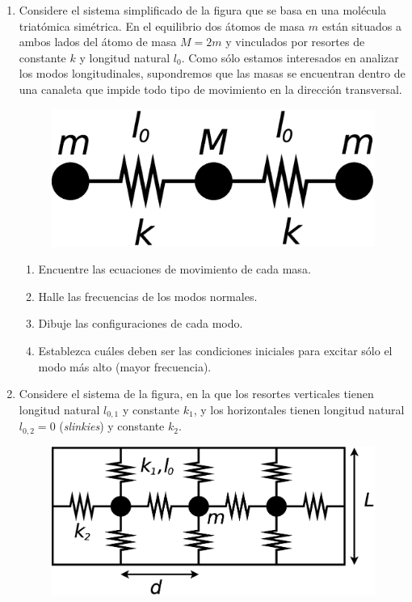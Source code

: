 \documentclass[11pt,spanish]{article}
\begin{document}
\begin{enumerate}

    \item Considere el sistema simplificado de la figura que se basa en una
    molécula triatómica simétrica. En el equilibrio dos átomos de masa $m$
    están situados a ambos lados del átomo de masa $M=2m$ y vinculados por
    resortes de constante $k$ y longitud natural $l_{0}$. Como sólo estamos
    interesados en analizar los modos longitudinales, supondremos que las masas
    se encuentran dentro de una canaleta que impide todo tipo de movimiento en
    la dirección transversal. 

    \begin{figure}[H]
        \centering{}\includegraphics[clip,scale=0.25]{figs/ej1-9}
    \end{figure}

    \begin{enumerate}
        \item Encuentre las ecuaciones de movimiento de cada masa. 
        \item Halle las frecuencias de los modos normales. 
        \item Dibuje las configuraciones de cada modo. 
        \item Establezca cuáles deben ser las condiciones iniciales para excitar
        sólo el modo más alto (mayor frecuencia).
    \end{enumerate}


    \item Considere el sistema de la figura, en la que los resortes verticales
    tienen longitud natural $l_{0,1}$ y constante $k_{1}$, y los horizontales
    tienen longitud natural $l_{0,2}=0$ (\textit{slinkies}) y constante $k_{2}$.

    \begin{figure}[H]
        \centering{}\includegraphics[clip,scale=0.25]{figs/ej1-10}
    \end{figure}


\end{enumerate}
\end{document}
